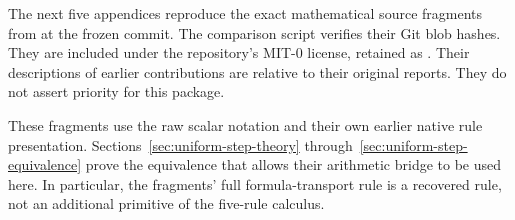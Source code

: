 The next five appendices reproduce the exact mathematical source
fragments from  at the
frozen commit. The comparison script verifies their Git blob hashes.
They are included under the repository's MIT-0 license, retained
as . Their descriptions of
earlier contributions are relative to their original reports.
They do not assert priority for this package.

These fragments use the raw scalar notation and their own earlier
native rule presentation. Sections~\ref{sec:uniform-step-theory}
through~\ref{sec:uniform-step-equivalence} prove the equivalence that
allows their arithmetic bridge to be used here. In particular,
the fragments' full formula-transport rule is a recovered rule,
not an additional primitive of the five-rule calculus.

